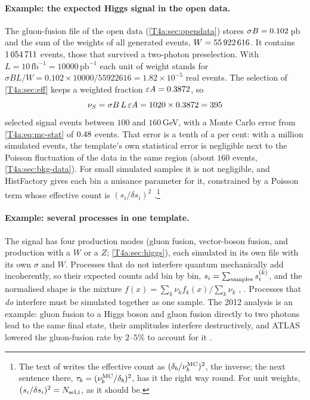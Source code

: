 \paragraph{Example: the expected Higgs signal in the open data.}
The gluon-fusion file of the open data (\cref{T4a:sec:opendata}) stores $\sigma B=0.102$\,pb and the sum of the weights of all generated events, $W=\num{55922616}$. It contains $\num{1054711}$ events, those that survived a two-photon preselection. With $L=10\,\mathrm{fb^{-1}}=\num{10000}\,\mathrm{pb^{-1}}$ each unit of weight stands for $\sigma BL/W=0.102\times\num{10000}/\num{55922616}=1.82\times10^{-5}$ real events. The selection of \cref{T4a:sec:eff} keeps a weighted fraction $\varepsilon A=0.3872$, so
\begin{equation*}
  \nu_S=\sigma B\,L\,\varepsilon A=1020\times0.3872=395
\end{equation*}
selected signal events between $100$ and $160$\,GeV, with a Monte Carlo error from \eqref{T4a:eq:mc-stat} of $\tfouraR{2}{\TfdNmcstat}$ events. That error is a tenth of a per cent: with a million simulated events, the template's own statistical error is negligible next to the Poisson fluctuation of the data in the same region (about $160$ events, \cref{T4a:sec:bkg-data}). For small simulated samples it is not negligible, and HistFactory gives each bin a nuisance parameter for it, constrained by a Poisson term whose effective count is $(s_i/\delta s_i)^2$ \cite[(9)]{HistFactory2012}.\footnote{The text of \cite[Sec.~2.2.1]{HistFactory2012} writes the effective count as $(\delta_b/\nu_b^{\rm MC})^2$, the inverse; the next sentence there, $\tau_b=(\nu_b^{\rm MC}/\delta_b)^2$, has it the right way round. For unit weights, $(s_i/\delta s_i)^2=N_{\rm sel,i}$, as it should be.}

\paragraph{Example: several processes in one template.}
The signal has four production modes (gluon fusion, vector-boson fusion, and production with a $W$ or a $Z$; \cref{T4a:sec:higgs}), each simulated in its own file with its own $\sigma$ and $W$. Processes that do not interfere quantum mechanically add incoherently, so their expected counts add bin by bin, $s_i=\sum_{\rm samples}s_i^{(k)}$, and the normalised shape is the mixture $f(x)=\sum_k\nu_kf_k(x)/\sum_k\nu_k$ \cite[(20)--(21)]{Cranmer2015}, . Processes that \emph{do} interfere must be simulated together as one sample. The 2012 analysis is an example: gluon fusion to a Higgs boson and gluon fusion directly to two photons lead to the same final state, their amplitudes interfere destructively, and ATLAS lowered the gluon-fusion rate by $2$--$5\%$ to account for it \cite[Sec.~5.4]{AadHiggs2012}.

